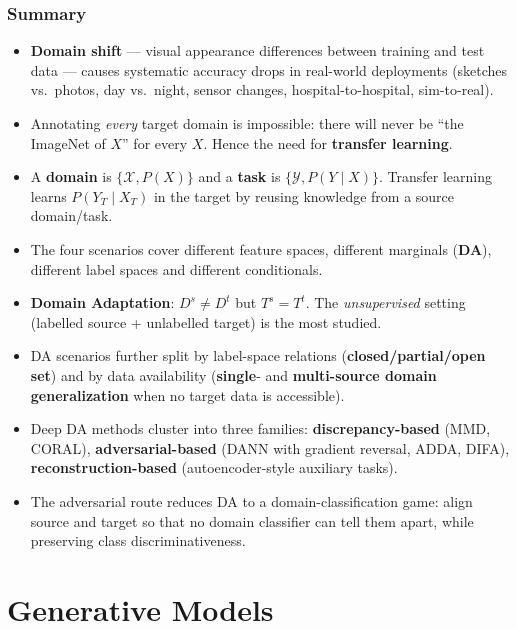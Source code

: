 \documentclass[11pt,a4paper]{article}
\theoremstyle{definition}
\theoremstyle{plain}
\theoremstyle{remark}
\begin{document}
\section{Summary}

\begin{tcolorbox}[colback=yellow!5!white,colframe=orange!80!black,title=\textbf{Take-Home Messages}]
\begin{itemize}[leftmargin=*]
    \item \textbf{Domain shift} --- visual appearance differences between training and test data --- causes systematic accuracy drops in real-world deployments (sketches vs.\ photos, day vs.\ night, sensor changes, hospital-to-hospital, sim-to-real).
    \item Annotating \emph{every} target domain is impossible: there will never be ``the ImageNet of $X$'' for every $X$. Hence the need for \textbf{transfer learning}.
    \item A \textbf{domain} is $\{\mathcal{X}, P(X)\}$ and a \textbf{task} is $\{\mathcal{Y}, P(Y\mid X)\}$. Transfer learning learns $P(Y_T\mid X_T)$ in the target by reusing knowledge from a source domain/task.
    \item The four scenarios cover different feature spaces, different marginals (\textbf{DA}), different label spaces and different conditionals.
    \item \textbf{Domain Adaptation}: $D^s \neq D^t$ but $T^s = T^t$. The \emph{unsupervised} setting (labelled source + unlabelled target) is the most studied.
    \item DA scenarios further split by label-space relations (\textbf{closed/partial/open set}) and by data availability (\textbf{single}- and \textbf{multi-source domain generalization} when no target data is accessible).
    \item Deep DA methods cluster into three families: \textbf{discrepancy-based} (MMD, CORAL), \textbf{adversarial-based} (DANN with gradient reversal, ADDA, DIFA), \textbf{reconstruction-based} (autoencoder-style auxiliary tasks).
    \item The adversarial route reduces DA to a domain-classification game: align source and target so that no domain classifier can tell them apart, while preserving class discriminativeness.
\end{itemize}
\end{tcolorbox}


\part{Generative Models}
\end{document}
